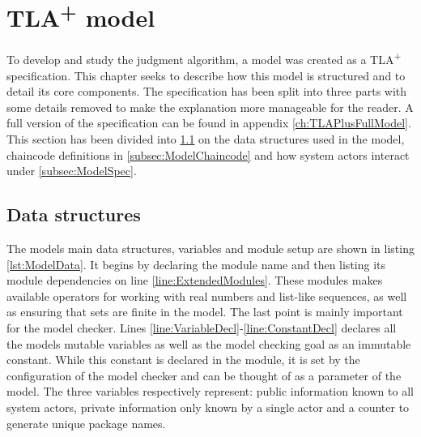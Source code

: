 \chapter{TLA\textsuperscript+ model}
\label{ch:Model}

To develop and study the judgment algorithm, a model was created as a TLA\textsuperscript+ specification. This chapter seeks to describe how this model is structured and to detail its core components. The specification has been split into three parts with some details removed to make the explanation more manageable for the reader. A full version of the specification can be found in appendix \ref{ch:TLAPlusFullModel}. This section has been divided into \ref{subsec:ModelData} on the data structures used in the model, chaincode definitions in \ref{subsec:ModelChaincode} and how system actors interact under \ref{subsec:ModelSpec}.

\lstset{
    escapechar=µ
    , numbers=left
    , firstnumber=auto}

\section{Data structures}
\label{subsec:ModelData}

The models main data structures, variables and module setup are shown in listing \ref{lst:ModelData}. It begins by declaring the module name and then listing its module dependencies on line \ref{line:ExtendedModules}. These modules makes available operators for working with real numbers and list-like sequences, as well as ensuring that sets are finite in the model. The last point is mainly important for the model checker. Lines \ref{line:VariableDecl}-\ref{line:ConstantDecl} declares all the models mutable variables as well as the model checking goal as an immutable constant. While this constant is declared in the module, it is set by the configuration of the model checker and can be thought of as a parameter of the model. The three variables respectively represent: public information known to all system actors, private information only known by a single actor and a counter to generate unique package names.

